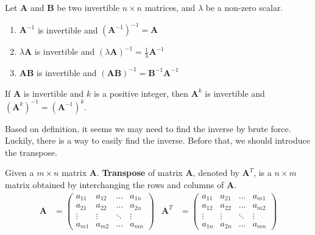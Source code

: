 \documentclass{huhtakm-template-book}
\begin{document}
\begin{thm}
    Let $\mathbf{A}$ and $\mathbf{B}$ be two invertible $n\times n$ matrices, and $\lambda$ be a non-zero scalar.
    \begin{enumerate}
        \item $\mathbf{A}^{-1}$ is invertible and $(\mathbf{A}^{-1})^{-1}=\mathbf{A}$
        \item $\lambda\mathbf{A}$ is invertible and $(\lambda\mathbf{A})^{-1}=\frac{1}{\lambda}\mathbf{A}^{-1}$
        \item $\mathbf{AB}$ is invertible and $(\mathbf{AB})^{-1}=\mathbf{B}^{-1}\mathbf{A}^{-1}$
    \end{enumerate}
\end{thm}
\begin{lem}
    If $\mathbf{A}$ is invertible and $k$ is a positive integer, then $\mathbf{A}^{k}$ is invertible and $(\mathbf{A}^{k})^{-1}=(\mathbf{A}^{-1})^{k}$.
\end{lem}
Based on definition, it seems we may need to find the inverse by brute force. Luckily, there is a way to easily find the inverse. Before that, we should introduce the transpose.
\begin{defn}
    Given a $m\times n$ matrix $\mathbf{A}$. \textbf{Transpose} of matrix $\mathbf{A}$, denoted by $\mathbf{A}^{T}$, is a $n\times m$ matrix obtained by interchanging the rows and columns of $\mathbf{A}$.
    \begin{align*}
        \mathbf{A}&=\begin{pmatrix}
            a_{11} & a_{12} & \hdots & a_{1n}\\
            a_{21} & a_{22} & \hdots & a_{2n}\\
            \vdots & \vdots & \ddots & \vdots\\
            a_{m1} & a_{m2} & \hdots & a_{mn}
        \end{pmatrix} & \mathbf{A}^{T}&=\begin{pmatrix}
            a_{11} & a_{21} & \hdots & a_{m1}\\
            a_{12} & a_{22} & \hdots & a_{m2}\\
            \vdots & \vdots & \ddots & \vdots\\
            a_{1n} & a_{2n} & \hdots & a_{mn}
        \end{pmatrix}
    \end{align*}
\end{defn}
\end{document}
